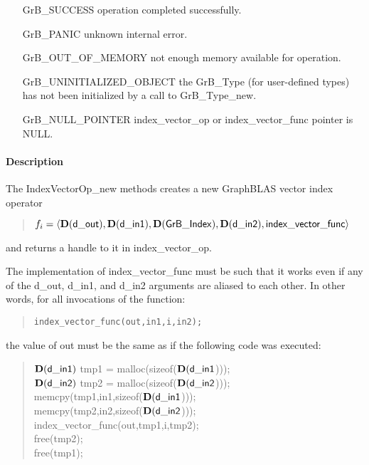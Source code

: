\begin{itemize}[leftmargin=2.1in]
\item[{\sf GrB\_SUCCESS}]           operation completed successfully.
\item[{\sf GrB\_PANIC}]             unknown internal error.
\item[{\sf GrB\_OUT\_OF\_MEMORY}]          not enough memory available for operation.
\item[{\sf GrB\_UNINITIALIZED\_OBJECT}]          the {\sf GrB\_Type} (for user-defined types)
                                    has not been initialized by a call to {\sf GrB\_Type\_new}.
\item[{\sf GrB\_NULL\_POINTER}]    {\sf index\_vector\_op} or {\sf index\_vector\_func} pointer is {\sf NULL}.

\end{itemize}

\paragraph{Description}

The {\sf IndexVectorOp\_new} methods creates a new GraphBLAS vector index operator
\begin{quote}
$f_{i} = \langle \mathbf{D}({\sf d\_out}), \mathbf{D}({\sf d\_in1}), \mathbf{D}({\sf GrB\_Index}), \mathbf{D}({\sf d\_in2}), {\sf index\_vector\_func} \rangle$
\end{quote}
and returns a handle to it in {\sf index\_vector\_op}.

The implementation of {\sf index\_vector\_func} must be such that it works
even if any of the {\sf d\_out}, {\sf d\_in1}, and {\sf d\_in2} arguments are aliased to each other.
In other words, for all invocations of the function:
\begin{quote}
\begin{verbatim}
index_vector_func(out,in1,i,in2);
\end{verbatim}
\end{quote}
the value of {\sf out} must be the same as if the following code
was executed:

\begin{quote}
\begin{code}
    $\mathbf{D}({\sf d\_in1})$ tmp1 = malloc(sizeof($\mathbf{D}({\sf d\_in1}$))); \\
    $\mathbf{D}({\sf d\_in2})$ tmp2 = malloc(sizeof($\mathbf{D}({\sf d\_in2}$))); \\
    memcpy(tmp1,in1,sizeof($\mathbf{D}({\sf d\_in1}$))); \\
    memcpy(tmp2,in2,sizeof($\mathbf{D}({\sf d\_in2}$))); \\
    index\_vector\_func(out,tmp1,i,tmp2); \\
    free(tmp2); \\
    free(tmp1);
\end{code}
\end{quote}

